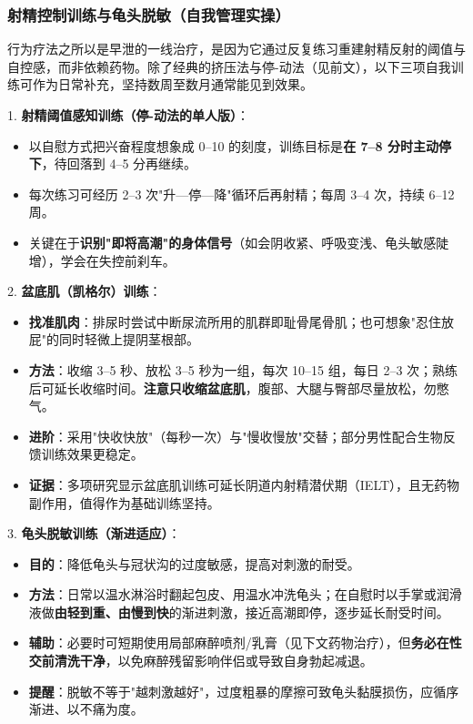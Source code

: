\subsubsection{射精控制训练与龟头脱敏（自我管理实操）}

行为疗法之所以是早泄的一线治疗，是因为它通过反复练习重建射精反射的阈值与自控感，而非依赖药物。除了经典的挤压法与停-动法（见前文），以下三项自我训练可作为日常补充，坚持数周至数月通常能见到效果。

1. \textbf{射精阈值感知训练（停-动法的单人版）}：
  \begin{itemize}
  \item 以自慰方式把兴奋程度想象成 0--10 的刻度，训练目标是\textbf{在 7--8 分时主动停下}，待回落到 4--5 分再继续。
  \item 每次练习可经历 2--3 次"升—停—降"循环后再射精；每周 3--4 次，持续 6--12 周。
  \item 关键在于\textbf{识别"即将高潮"的身体信号}（如会阴收紧、呼吸变浅、龟头敏感陡增），学会在失控前刹车。
  \end{itemize}

2. \textbf{盆底肌（凯格尔）训练}：
  \begin{itemize}
  \item \textbf{找准肌肉}：排尿时尝试中断尿流所用的肌群即耻骨尾骨肌；也可想象"忍住放屁"的同时轻微上提阴茎根部。
  \item \textbf{方法}：收缩 3--5 秒、放松 3--5 秒为一组，每次 10--15 组，每日 2--3 次；熟练后可延长收缩时间。\textbf{注意只收缩盆底肌}，腹部、大腿与臀部尽量放松，勿憋气。
  \item \textbf{进阶}：采用"快收快放"（每秒一次）与"慢收慢放"交替；部分男性配合生物反馈训练效果更稳定。
  \item \textbf{证据}：多项研究显示盆底肌训练可延长阴道内射精潜伏期（IELT），且无药物副作用，值得作为基础训练坚持。
  \end{itemize}

3. \textbf{龟头脱敏训练（渐进适应）}：
  \begin{itemize}
  \item \textbf{目的}：降低龟头与冠状沟的过度敏感，提高对刺激的耐受。
  \item \textbf{方法}：日常以温水淋浴时翻起包皮、用温水冲洗龟头；在自慰时以手掌或润滑液做\textbf{由轻到重、由慢到快}的渐进刺激，接近高潮即停，逐步延长耐受时间。
  \item \textbf{辅助}：必要时可短期使用局部麻醉喷剂/乳膏（见下文药物治疗），但\textbf{务必在性交前清洗干净}，以免麻醉残留影响伴侣或导致自身勃起减退。
  \item \textbf{提醒}：脱敏不等于"越刺激越好"，过度粗暴的摩擦可致龟头黏膜损伤，应循序渐进、以不痛为度。
  \end{itemize}

